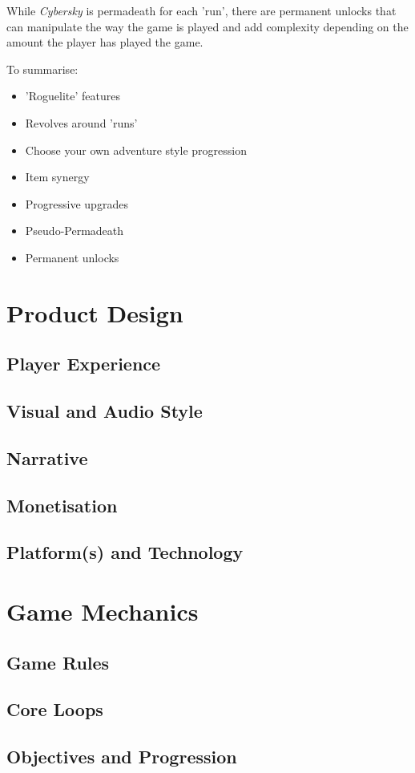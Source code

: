 \documentclass{scrartcl}
\begin{document}
While \emph{Cybersky} is permadeath for each 'run', there are permanent unlocks that can manipulate the way the game is played and add complexity depending on the amount the player has played the game.

To summarise:

\begin{itemize}
  \item 'Roguelite' features
  \item Revolves around 'runs'
  \item Choose your own adventure style progression
  \item Item synergy
  \item Progressive upgrades
  \item Pseudo-Permadeath
  \item Permanent unlocks
\end{itemize}

\section{
  Product Design
 }

\subsection{Player Experience}

\subsection{Visual and Audio Style}

\subsection{Narrative}

\subsection{Monetisation}

\subsection{Platform(s) and Technology}

\section{
  Game Mechanics
 }

\subsection{Game Rules}

\subsection{Core Loops}

\subsection{Objectives and Progression}

\printbibliography
\end{document}

